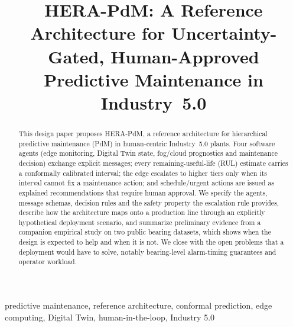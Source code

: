 \documentclass[conference]{IEEEtran}
\begin{document}
\title{HERA-PdM: A Reference Architecture for Uncertainty-Gated, Human-Approved Predictive Maintenance in Industry~5.0}

\author{}

\maketitle

\begin{abstract}
This design paper proposes HERA-PdM, a reference architecture for hierarchical predictive maintenance (PdM) in human-centric Industry~5.0 plants. Four software agents (edge monitoring, Digital Twin state, fog/cloud prognostics and maintenance decision) exchange explicit messages; every remaining-useful-life (RUL) estimate carries a conformally calibrated interval; the edge escalates to higher tiers only when its interval cannot fix a maintenance action; and schedule/urgent actions are issued as explained recommendations that require human approval. We specify the agents, message schemas, decision rules and the safety property the escalation rule provides, describe how the architecture maps onto a production line through an explicitly hypothetical deployment scenario, and summarize preliminary evidence from a companion empirical study on two public bearing datasets, which shows when the design is expected to help and when it is not. We close with the open problems that a deployment would have to solve, notably bearing-level alarm-timing guarantees and operator workload.
\end{abstract}

\begin{IEEEkeywords}
predictive maintenance, reference architecture, conformal prediction, edge computing, Digital Twin, human-in-the-loop, Industry 5.0
\end{IEEEkeywords}
\end{document}
